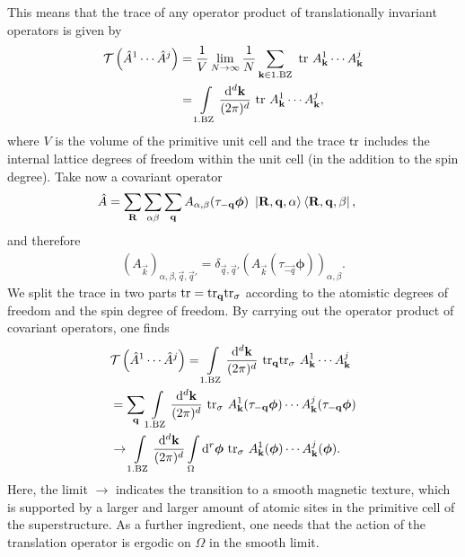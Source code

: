 \documentclass[
    10pt,
    aps,
    prb,
    twocolumn,
    floatfix,
    superscriptaddress,
]{revtex4-2}
\begin{document}
This means that the trace of any operator product of translationally invariant operators is given by
\begin{align}
\mathcal{T} \left( \hat{A}^1 \cdots  \hat{A}^j \right) &=
\frac{1}{V}
\lim\limits_{N\to \infty}	\frac{1}{N} \sum_{\mathbf{k} \in \mathrm{1.BZ}} ~ \mathrm{tr}~ A^1_{\mathbf{k}} \cdots A^j_{\mathbf{k}}
\notag \\
& =   \int\limits_{\mathrm{1.BZ}}  \frac{\mathrm{d}^d \mathbf{k}}{(2\pi)^d}~ \mathrm{tr}~ A^1_{\mathbf{k}} \cdots A^j_{\mathbf{k}},
\end{align}
where $V$ is the volume of the primitive unit cell and the trace $\mathrm{tr}$ includes the internal lattice degrees of freedom within the unit cell (in the addition to the spin degree).
Take now a covariant operator
\begin{align}
	\hat{A} &=
	\sum_{\mathbf{R}} \sum_{\alpha\beta}
	\sum_{\mathbf{q} }  A_{\alpha,\beta}( \tau_{\mathbf{-q}}\boldsymbol{\phi})~ \ket{\mathbf{R},\mathbf{q}, \alpha}\bra{\mathbf{R},\mathbf{q}, \beta} ,
\end{align}
and therefore
\begin{align}
	(A_{\vec{k}})_{ \alpha, \beta, \vec{q}, \vec{q}'}
	= \delta_{\vec{q}, \vec{q}'} (A_{\vec{k}}( \tau_\vec{-q}\boldsymbol{\phi}))_{ \alpha, \beta} . 
\end{align}
We split the trace in two parts $\mathrm{tr} = \mathrm{tr}_{\mathbf{q}} \mathrm{tr}_{\sigma} $ according to the atomistic degrees of freedom and the spin degree of freedom. 
By carrying out the operator product of covariant operators, one finds
\begin{align}
	&\mathcal{T} \left( \hat{A}^1 \cdots  \hat{A}^j \right)  =   \int\limits_{\mathrm{1.BZ}}\frac{\mathrm{d}^d \mathbf{k}}{(2\pi)^d}~ \mathrm{tr}_{\mathbf{q}} \mathrm{tr}_\sigma ~ A^1_{\mathbf{k}} \cdots A^j_{\mathbf{k}}
	\notag \\
	&=
 \sum_{\mathbf{q}}\int\limits_{\mathrm{1.BZ}} \frac{\mathrm{d}^d \mathbf{k}}{(2\pi)^d}~ \mathrm{tr}_\sigma ~ A^1_{\mathbf{k}}( \tau_{\mathbf{-q}}\boldsymbol{\phi})\cdots A^j_{\mathbf{k}}( \tau_{\mathbf{-q}}\boldsymbol{\phi})
	\notag \\
	&  
	\to
	\int\limits_{\mathrm{1.BZ}} \frac{\mathrm{d}^d \mathbf{k}}{(2\pi)^d} \int \limits_{\Omega}\mathrm{d}^r \boldsymbol{\phi}~ \mathrm{tr}_\sigma ~ A^1_{\mathbf{k}}( \boldsymbol{\phi})\cdots A^j_{\mathbf{k}}( \boldsymbol{\phi}) .
	\end{align}
Here, the limit $\to$ indicates the transition to a smooth magnetic texture, which is supported by a larger and larger amount of atomic sites in the primitive cell of the superstructure.
As a further ingredient, one needs that the action of the translation operator is ergodic on $\Omega$ in the smooth limit.
\end{document}
